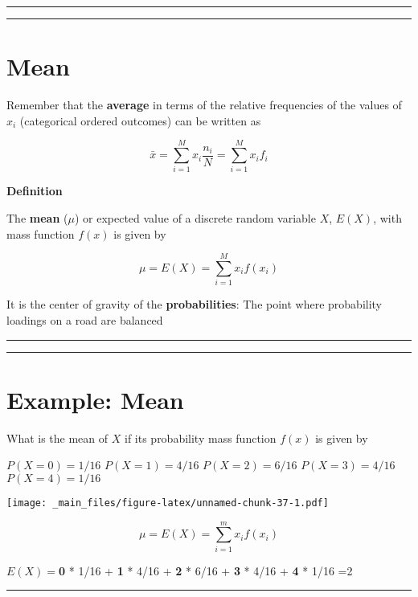 \documentclass[
]{book}
\begin{document}
\begin{center}\rule{0.5\linewidth}{0.5pt}\end{center}

\begin{center}\rule{0.5\linewidth}{0.5pt}\end{center}

\hypertarget{mean}{%
\section{Mean}\label{mean}}

Remember that the \textbf{average} in terms of the relative frequencies of the values of \(x_i\) (categorical ordered outcomes) can be written as

\[\bar{x}= \sum_{i=1}^M x_i \frac{n_i}{N}=\sum_{i=1}^M x_i f_i\]

\textbf{Definition}

The \textbf{mean} (\(\mu\)) or expected value of a discrete random variable \(X\), \(E(X)\), with mass function \(f(x)\) is given by

\[ \mu = E(X)= \sum_{i=1}^M x_i f(x_i) \]

It is the center of gravity of the \textbf{probabilities}: The point where probability loadings on a road are balanced

\begin{center}\rule{0.5\linewidth}{0.5pt}\end{center}

\begin{center}\rule{0.5\linewidth}{0.5pt}\end{center}

\hypertarget{example-mean}{%
\section{Example: Mean}\label{example-mean}}

What is the mean of \(X\) if its probability mass function \(f(x)\) is given by

\(P(X=0)=1/16\)
\(P(X=1)=4/16\)
\(P(X=2)=6/16\)
\(P(X=3)=4/16\)
\(P(X=4)=1/16\)

\texttt{[image: \_main\_files/figure-latex/unnamed-chunk-37-1.pdf]}

\[ \mu =E(X)=\sum_{i=1}^m x_i f(x_i) \]

\(E(X)=\)\textbf{0} * 1/16 + \textbf{1} * 4/16 + \textbf{2} * 6/16 + \textbf{3} * 4/16 + \textbf{4} * 1/16 =2

\begin{center}\rule{0.5\linewidth}{0.5pt}\end{center}
\end{document}

